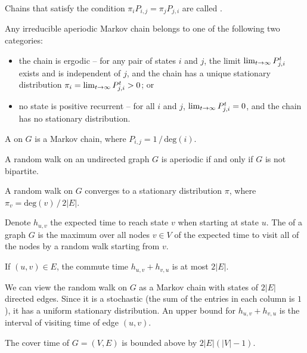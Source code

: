 \documentclass[main.tex]{subfiles}
\begin{document}
Chains that satisfy the condition $\pi_iP_{i,j}=\pi_jP_{j,i}$ are called .

\begin{theorem}
	Any irreducible aperiodic Markov chain belongs to one of the following two categories:
	\begin{itemize}
		\item the chain is ergodic -- for any pair of states $i$ and $j$, the limit $\lim_{t\rightarrow\infty}P^t_{j,i}$ exists and is independent of $j$, and the chain has a unique stationary distribution $\pi_i=\lim_{t\rightarrow\infty}P^t_{j,i}>0$; or 
		\item no state is positive recurrent -- for all $i$ and $j$, $\lim_{t\rightarrow\infty}P^t_{j,i}=0$, and the chain has no stationary distribution.
	\end{itemize}
\end{theorem}

A  on $G$ is a Markov chain, where $P_{i,j}=1\,/\,\mathrm{deg}(i)$.

\begin{lemma}
	A random walk on an undirected graph $G$ is aperiodic if and only if $G$ is not bipartite.
\end{lemma}

\begin{theorem}
	A random walk on $G$ converges to a stationary distribution $\pi$, where $\pi_v=\mathrm{deg}(v)\,/\,2 |E|$.
\end{theorem}

Denote  $h_{u,v}$ the expected time to reach state $v$ when starting at state $u$. The  of a graph $G$ is the maximum over all nodes $v\in V$ of the expected time to visit all of the nodes by a random walk starting from $v$.

\begin{lemma}
	If $(u,v)\in E$, the commute time $h_{u,v}+h_{v,u}$ is at most $2 |E|$.
\end{lemma}

\begin{pf}
	We can view the random walk on $G$ as a Markov chain with states of $2 |E|$ directed edges. Since it is a  stochastic (the sum of the entries in each column is $1$), it has a uniform stationary distribution. An upper bound for $h_{u,v}+h_{v,u}$ is the interval of visiting time of edge $(u,v)$.
\end{pf}

\begin{lemma}
	The cover time of $G=(V,E)$ is bounded above by $2|E|(|V|-1)$.
\end{lemma}
\end{document}
